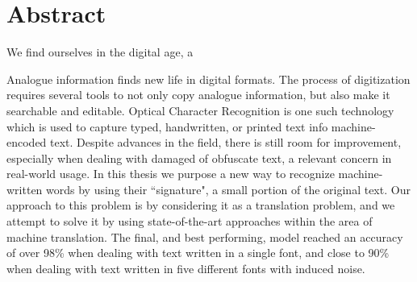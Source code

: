 
\chapter*{Abstract}
We find ourselves in the digital age, a

Analogue information finds new life in digital formats. The process of digitization requires several tools to not only copy analogue information, but also make it searchable and editable. Optical Character Recognition is one such technology which is used to capture typed, handwritten, or printed text info machine-encoded text. Despite advances in the field, there is still room for improvement, especially when dealing with damaged of obfuscate text, a relevant concern in real-world usage. In this thesis we purpose a new way to recognize machine-written words by using their ``signature", a small portion of the original text. Our approach to this problem is by considering it as a translation problem, and we attempt to solve it by using state-of-the-art approaches within the area of machine translation. The final, and best performing, model reached an accuracy of over 98\% when dealing with text written in a single font, and close to 90\% when dealing with text written in five different fonts with induced noise.